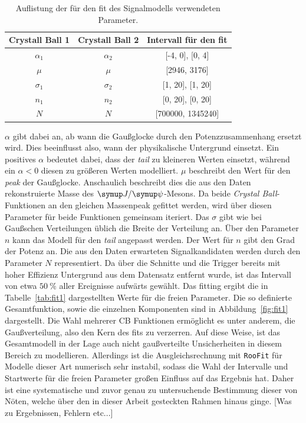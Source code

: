 %
%
\begin{table}[H]
  \centering
  \caption{Auflistung der für den fit des Signalmodells verwendeten Parameter.}
  \begin{tabular}{ccc}
    \toprule
    \textbf{Crystall Ball 1}    & \textbf{Crystall Ball 2} & Intervall für den fit \\
    \midrule
    $\alpha_1$                  & $\alpha_2$               & [-4, 0], [0, 4] \\
    $\mu$                       & $\mu$                    & [2946, 3176] \\
    $\sigma_1$                  & $\sigma_2$               & [1, 20], [1, 20] \\
    $n_1$                       & $n_2$                    & [0, 20], [0, 20] \\
    $N$                         & $N$                      & [700000, 1345240] \\
    \bottomrule
  \end{tabular}
  \label{tab:params}
\end{table}
%
$\alpha$ gibt dabei an, ab wann die Gaußglocke durch den Potenzzusammenhang ersetzt wird. Dies beeinflusst also, wann der physikalische
Untergrund einsetzt. Ein positives $\alpha$ bedeutet dabei, dass der \textit{tail} zu kleineren Werten einsetzt, während ein $\alpha<0$
diesen zu größeren Werten modelliert. $\mu$ beschreibt den Wert für den \textit{peak} der Gaußglocke. Anschaulich beschreibt dies die aus
den Daten rekonstruierte Masse des $\jpsi$-Mesons. Da beide \textit{Crystal Ball}-Funktionen an den gleichen Massenpeak gefittet werden,
wird über diesen Parameter für beide Funktionen gemeinsam iteriert. Das $\sigma$ gibt wie bei Gaußschen Verteilungen üblich die Breite der Verteilung an. Über den Parameter $n$ kann das Modell für den \textit{tail} angepasst werden. Der Wert für $n$ gibt den Grad der Potenz
an. Die aus den Daten erwarteten Signalkandidaten werden durch den Parameter $N$ representiert. Da über die Schnitte und die Trigger bereits mit hoher Effizienz Untergrund aus dem Datensatz entfernt wurde, ist das Intervall von etwa $\SI{50}{\percent}$ aller Ereignisse aufwärts gewählt.
Das fitting ergibt die in Tabelle~\ref{tab:fit1} dargestellten Werte für die freien Parameter. Die so definierte Gesamtfunktion, sowie die einzelnen Komponenten sind in Abbildung~\ref{fig:fit1} dargestellt. Die Wahl mehrerer CB Funktionen ermöglicht es unter anderem, die Gaußverteilung, also den Kern des fits zu verzerren. Auf diese Weise, ist das Gesamtmodell in der Lage auch nicht gaußverteilte Unsicherheiten in diesem Bereich zu modellieren. Allerdings ist die Ausgleichsrechnung mit \texttt{RooFit} für Modelle dieser Art numerisch sehr instabil, sodass die Wahl der Intervalle und Startwerte für die freien Parameter großen Einfluss auf das Ergebnis hat. Daher ist eine systematische und zuvor genau zu untersuchende Bestimmung dieser von Nöten, welche über den in dieser Arbeit gesteckten Rahmen hinaus ginge. [Was zu Ergebnissen, Fehlern etc...]
